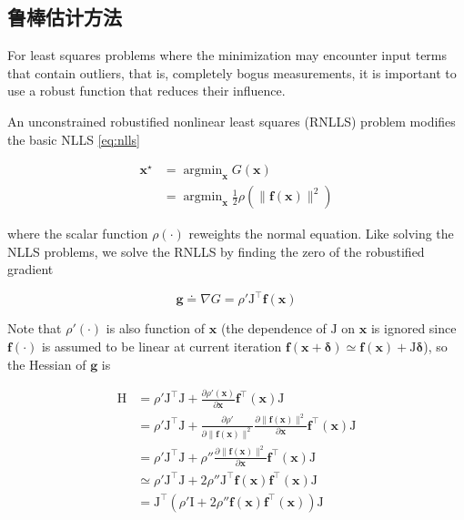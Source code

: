 \subsection{鲁棒估计方法}

For least squares problems where the minimization may encounter input terms that contain outliers, that is, completely bogus measurements, it is important to use a robust function that reduces their influence\citep{ceres-solver}.

An unconstrained robustified nonlinear least squares (RNLLS) problem modifies the basic NLLS \eqref{eq:nlls}

\begin{equation}\label{eq:rnlls}
\begin{aligned}
    \bm{x}^\star &= \mathop{\arg\min}_{\bm{x}} G(\bm{x}) \\
                 &= \mathop{\arg\min}_{\bm{x}}
                    \frac{1}{2} \rho
                    \left( \lVert \mathbf{f}(\bm{x}) \rVert^2 \right)
\end{aligned}
\end{equation}

where the scalar function $\rho(\cdot)$ reweights the normal equation. Like solving the NLLS problems, we solve the RNLLS by finding the zero of the robustified gradient

\begin{equation}
    \bm{g} \doteq \nabla G = \rho' \mathrm{J}^\top \mathbf{f}(\bm{x})
\end{equation}

Note that $\rho'(\cdot)$ is also function of $\bm{x}$ (the dependence of $\mathrm{J}$ on $\bm{x}$ is ignored since $\mathbf{f}(\cdot)$ is assumed to be linear at current iteration $\mathbf{f}(\bm{x} + \bm{\delta}) \simeq \mathbf{f}(\bm{x}) + \mathrm{J}\bm{\delta}$), so the Hessian of $\bm{g}$ is

\begin{equation}
\begin{aligned}
    \mathrm{H}
           &=
              \rho' \mathrm{J}^\top \mathrm{J} +
              \frac{\partial\rho'(\bm{x})}{\partial\bm{x}}
              \mathbf{f}^\top(\bm{x})\mathrm{J} \\
           &=
              \rho' \mathrm{J}^\top \mathrm{J} +
              \frac{\partial\rho'}{\partial\lVert\mathbf{f}(\bm{x})\rVert^2}
              \frac{\partial\lVert\mathbf{f}(\bm{x})\rVert^2}{\partial\bm{x}}
              \mathbf{f}^\top(\bm{x}) \mathrm{J} \\
           &=
              \rho' \mathrm{J}^\top \mathrm{J} + \rho''
              \frac{\partial\lVert\mathbf{f}(\bm{x})\rVert^2}{\partial\bm{x}}
              \mathbf{f}^\top(\bm{x}) \mathrm{J} \\
           &\simeq
              \rho' \mathrm{J}^\top \mathrm{J} + 2\rho''
              \mathrm{J}^\top \mathbf{f}(\bm{x}) \mathbf{f}^\top(\bm{x}) \mathrm{J} \\
           &=
              \mathrm{J}^\top \left(
                  \rho'\mathrm{I} + 2\rho''
                  \mathbf{f}(\bm{x}) \mathbf{f}^\top(\bm{x})
              \right) \mathrm{J}
\end{aligned}
\end{equation}

